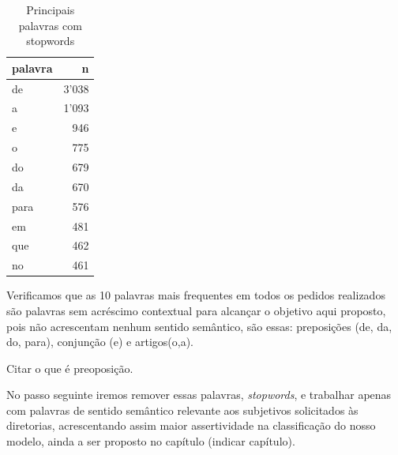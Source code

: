 \documentclass[]{article}
\newenvironment{Shaded}{\begin{snugshade}}{\end{snugshade}}
\newcommand{\KeywordTok}[1]{\textcolor[rgb]{0.13,0.29,0.53}{\textbf{#1}}}
\newcommand{\DataTypeTok}[1]{\textcolor[rgb]{0.13,0.29,0.53}{#1}}
\newcommand{\DecValTok}[1]{\textcolor[rgb]{0.00,0.00,0.81}{#1}}
\newcommand{\StringTok}[1]{\textcolor[rgb]{0.31,0.60,0.02}{#1}}
\newcommand{\OperatorTok}[1]{\textcolor[rgb]{0.81,0.36,0.00}{\textbf{#1}}}
\newcommand{\NormalTok}[1]{#1}
\begin{document}
\begin{Shaded}
\end{Shaded}

\begin{table}[!h]

\caption{\label{tab:unnamed-chunk-19}Principais palavras com stopwords}
\centering
\begin{tabular}{lr}
\toprule
palavra & n\\
\midrule
\rowcolor{gray!6}  de & 3'038\\
a & 1'093\\
\rowcolor{gray!6}  e & 946\\
o & 775\\
\rowcolor{gray!6}  do & 679\\
\addlinespace
da & 670\\
\rowcolor{gray!6}  para & 576\\
em & 481\\
\rowcolor{gray!6}  que & 462\\
no & 461\\
\bottomrule
\end{tabular}
\end{table}

Verificamos que as 10 palavras mais frequentes em todos os pedidos
realizados são palavras sem acréscimo contextual para alcançar o
objetivo aqui proposto, pois não acrescentam nenhum sentido semântico,
são essas: preposições (de, da, do, para), conjunção (e) e artigos(o,a).

Citar o que é preoposição.

No passo seguinte iremos remover essas palavras, \emph{stopwords}, e
trabalhar apenas com palavras de sentido semântico relevante aos
subjetivos solicitados às diretorias, acrescentando assim maior
assertividade na classificação do nosso modelo, ainda a ser proposto no
capítulo (indicar capítulo).
\end{document}

